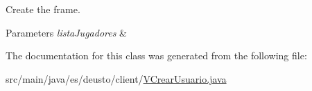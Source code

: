 Create the frame. 
\begin{DoxyParams}{Parameters}
{\em lista\+Jugadores} & \\
\hline
\end{DoxyParams}


The documentation for this class was generated from the following file\+:\begin{DoxyCompactItemize}
\item 
src/main/java/es/deusto/client/\mbox{\hyperlink{_v_crear_usuario_8java}{V\+Crear\+Usuario.\+java}}\end{DoxyCompactItemize}
